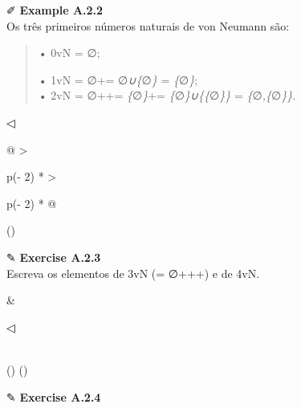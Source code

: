 \documentclass[
]{article}
\begin{document}
✐ \textbf{Example A.2.2}\\
Os três primeiros números naturais de von Neumann são:

\begin{quote}
• 0vN = ∅;

• 1vN = ∅+= ∅\emph{∪\{}∅\emph{\}} = \emph{\{}∅\emph{\}};\\
• 2vN = ∅++= \emph{\{}∅\emph{\}}+= \emph{\{}∅\emph{\}∪\{\{}∅\emph{\}\}}
= \emph{\{}∅\emph{,\{}∅\emph{\}\}}.
\end{quote}

◁

\begin{longtable}[]{@{}
  >{\raggedright\arraybackslash}p{(\columnwidth - 2\tabcolsep) * }
  >{\raggedright\arraybackslash}p{(\columnwidth - 2\tabcolsep) * }@{}}
\toprule()
\begin{minipage}[b]{\linewidth}\raggedright
✎ \textbf{Exercise A.2.3}\\
Escreva os elementos de 3vN (= ∅+++) e de 4vN.\strut
\end{minipage} & \begin{minipage}[b]{\linewidth}\raggedright
◁
\end{minipage} \\
\midrule()
\endhead
\bottomrule()
\end{longtable}

✎ \textbf{Exercise A.2.4}
\end{document}
